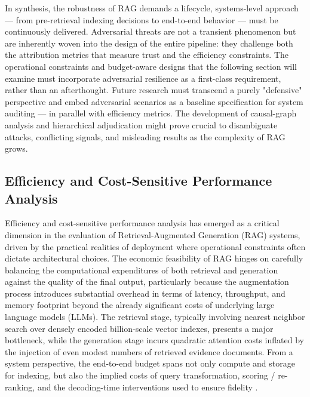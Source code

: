 \documentclass[11pt,a4paper]{article}
\begin{document}
In synthesis, the robustness of RAG demands a lifecycle, systems-level approach --- from pre-retrieval indexing decisions to end-to-end behavior --- must be continuously delivered. Adversarial threats are not a transient phenomenon but are inherently woven into the design of the entire pipeline: they challenge both the attribution metrics that measure trust and the efficiency constraints. The operational constraints and budget-aware designs that the following section will examine must incorporate adversarial resilience as a first-class requirement, rather than an afterthought. Future research must transcend a purely "defensive" perspective and embed adversarial scenarios as a baseline specification for system auditing --- in parallel with efficiency metrics. The development of causal-graph analysis and hierarchical adjudication might prove crucial to disambiguate attacks, conflicting signals, and misleading results as the complexity of RAG grows.


\subsection{Efficiency and Cost-Sensitive Performance Analysis}


Efficiency and cost-sensitive performance analysis has emerged as a critical dimension in the evaluation of Retrieval-Augmented Generation (RAG) systems, driven by the practical realities of deployment where operational constraints often dictate architectural choices. The economic feasibility of RAG hinges on carefully balancing the computational expenditures of both retrieval and generation against the quality of the final output, particularly because the augmentation process introduces substantial overhead in terms of latency, throughput, and memory footprint beyond the already significant costs of underlying large language models (LLMs). The retrieval stage, typically involving nearest neighbor search over densely encoded billion-scale vector indexes, presents a major bottleneck, while the generation stage incurs quadratic attention costs inflated by the injection of even modest numbers of retrieved evidence documents. From a system perspective, the end-to-end budget spans not only compute and storage for indexing, but also the implied costs of query transformation, scoring / re-ranking, and the decoding-time interventions used to ensure fidelity \cite{arxiv:2506.00054v1}.
\end{document}
